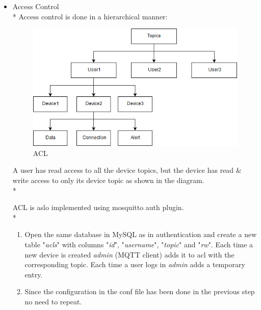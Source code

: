 \documentclass{report}
\begin{document}
\begin{itemize}
    \item Access Control\\* 
    Access control is done in a hierarchical manner:
    
    \begin{figure}[H]
        \centering
        \includegraphics[scale=0.6]{ACL.jpg}
        \caption{ACL}
        \label{fig:ACL}
    \end{figure}

    A user has read access to all the device topics, but the device has read & write access to only its device topic as shown in the diagram.\\*

    ACL is aslo implemented using mosquitto auth plugin.\\*

    \begin{enumerate}
        \item Open the same database in MySQL as in authentication and create a new table "\textit{acls}" with columns "\textit{id}", "\textit{username}", "\textit{topic}" and "\textit{rw}". Each time a new device is created \textit{admin} (MQTT client) adds it to acl with the corresponding topic. Each time a user logs in \textit{admin} adds a temporary entry.
        \item Since the configuration in the conf file has been done in the previous step no need to repeat.
    \end{enumerate}


\end{itemize}
\end{document}
